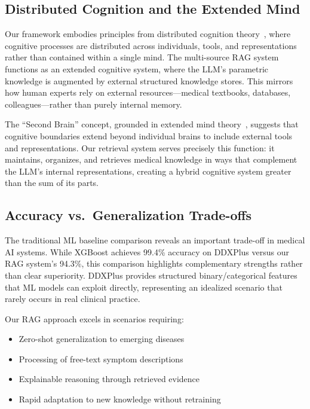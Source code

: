 \documentclass[preprint,12pt]{elsarticle}
\begin{document}
\subsection{Distributed Cognition and the Extended Mind}

Our framework embodies principles from distributed cognition theory~\cite{hutchins1995cognition}, where cognitive processes are distributed across individuals, tools, and representations rather than contained within a single mind. The multi-source RAG system functions as an extended cognitive system, where the LLM's parametric knowledge is augmented by external structured knowledge stores. This mirrors how human experts rely on external resources---medical textbooks, databases, colleagues---rather than purely internal memory.

The ``Second Brain'' concept, grounded in extended mind theory~\cite{clark1998extended}, suggests that cognitive boundaries extend beyond individual brains to include external tools and representations. Our retrieval system serves precisely this function: it maintains, organizes, and retrieves medical knowledge in ways that complement the LLM's internal representations, creating a hybrid cognitive system greater than the sum of its parts.

\subsection{Accuracy vs.\ Generalization Trade-offs}

The traditional ML baseline comparison reveals an important trade-off in medical AI systems. While XGBoost achieves 99.4\% accuracy on DDXPlus versus our RAG system's 94.3\%, this comparison highlights complementary strengths rather than clear superiority. DDXPlus provides structured binary/categorical features that ML models can exploit directly, representing an idealized scenario that rarely occurs in real clinical practice.

Our RAG approach excels in scenarios requiring:
\begin{itemize}
    \item Zero-shot generalization to emerging diseases
    \item Processing of free-text symptom descriptions
    \item Explainable reasoning through retrieved evidence
    \item Rapid adaptation to new knowledge without retraining
\end{itemize}
\end{document}
